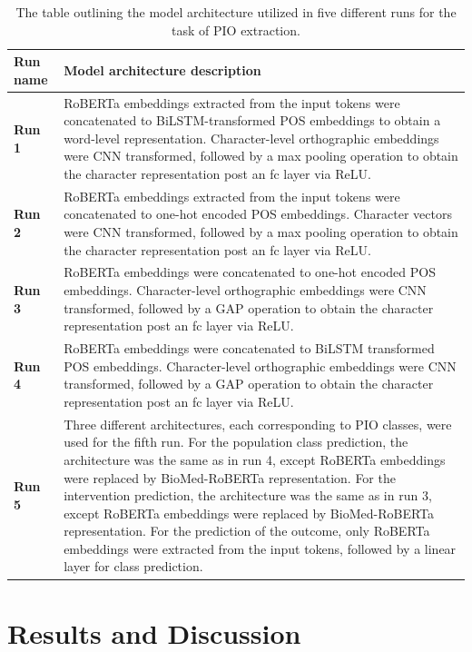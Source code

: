 \documentclass[11pt]{article}
\begin{document}
\begin{table}[h]
    \centering
    \begin{tabular}{lp{13cm}}
    \toprule
   Run name & Model architecture description \\ \midrule
       \textbf{Run 1} & RoBERTa embeddings extracted from the input tokens were concatenated to BiLSTM-transformed POS embeddings to obtain a word-level representation. Character-level orthographic embeddings were CNN transformed, followed by a max pooling operation to obtain the character representation post an fc layer via ReLU. \\
       \textbf{Run 2} & RoBERTa embeddings extracted from the input tokens were concatenated to one-hot encoded POS embeddings. Character vectors were CNN transformed, followed by a max pooling operation to obtain the character representation post an fc layer via ReLU. \\
        \textbf{Run 3} & RoBERTa embeddings were concatenated to one-hot encoded POS embeddings. Character-level orthographic embeddings were CNN transformed, followed by a GAP operation to obtain the character representation post an fc layer via ReLU. \\
        \textbf{Run 4} & RoBERTa embeddings were concatenated to BiLSTM transformed POS embeddings. Character-level orthographic embeddings were CNN transformed, followed by a GAP operation to obtain the character representation post an fc layer via ReLU. \\
        \textbf{Run 5}  & Three different architectures, each corresponding to PIO classes, were used for the fifth run. For the population class prediction, the architecture was the same as in run 4, except RoBERTa embeddings were replaced by BioMed-RoBERTa representation. For the intervention prediction, the architecture was the same as in run 3, except RoBERTa embeddings were replaced by BioMed-RoBERTa representation. For the prediction of the outcome, only RoBERTa embeddings were extracted from the input tokens, followed by a linear layer for class prediction. \\
         \bottomrule
    \end{tabular}
    \caption{The table outlining the model architecture utilized in five different runs for the task of PIO extraction.}
    \label{tab:runs_task2}
\end{table}
%
%
%
\section{Results and Discussion}
\label{sec:results}
%
%
%
\end{document}
